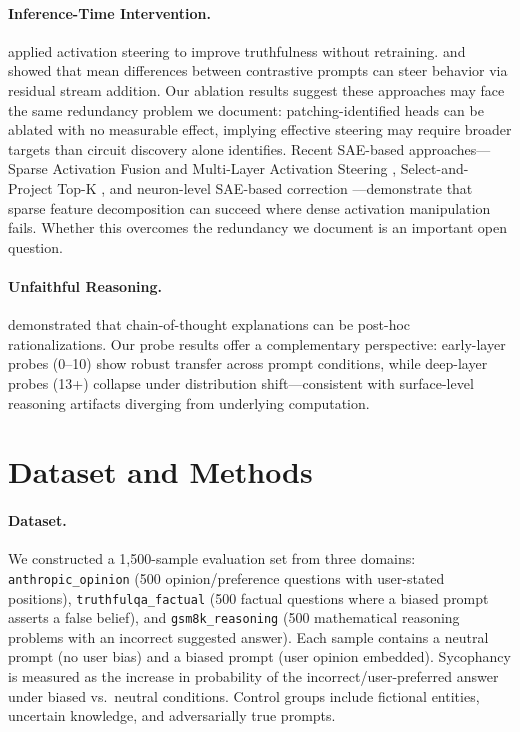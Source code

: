 \documentclass{article}
\begin{document}
\paragraph{Inference-Time Intervention.}
\citet{li2023inference} applied activation steering to improve truthfulness without retraining. \citet{turner2023activation} and \citet{zou2023representation} showed that mean differences between contrastive prompts can steer behavior via residual stream addition. Our ablation results suggest these approaches may face the same redundancy problem we document: patching-identified heads can be ablated with no measurable effect, implying effective steering may require broader targets than circuit discovery alone identifies. Recent SAE-based approaches---Sparse Activation Fusion and Multi-Layer Activation Steering \citep{venhoff2025saf}, Select-and-Project Top-K \citep{paduraru2025sp}, and neuron-level SAE-based correction \citep{obrien2026fewbad}---demonstrate that sparse feature decomposition can succeed where dense activation manipulation fails. Whether this overcomes the redundancy we document is an important open question.

\paragraph{Unfaithful Reasoning.}
\citet{turpin2024language} demonstrated that chain-of-thought explanations can be post-hoc rationalizations. Our probe results offer a complementary perspective: early-layer probes (0--10) show robust transfer across prompt conditions, while deep-layer probes (13+) collapse under distribution shift---consistent with surface-level reasoning artifacts diverging from underlying computation.

\section{Dataset and Methods}
\label{sec:methods}

\paragraph{Dataset.}
We constructed a 1,500-sample evaluation set from three domains: \texttt{anthropic\_opinion} (500 opinion/preference questions with user-stated positions), \texttt{truthfulqa\_factual} (500 factual questions where a biased prompt asserts a false belief), and \texttt{gsm8k\_reasoning} (500 mathematical reasoning problems with an incorrect suggested answer). Each sample contains a neutral prompt (no user bias) and a biased prompt (user opinion embedded). Sycophancy is measured as the increase in probability of the incorrect/user-preferred answer under biased vs.\ neutral conditions. Control groups include fictional entities, uncertain knowledge, and adversarially true prompts.
\end{document}
